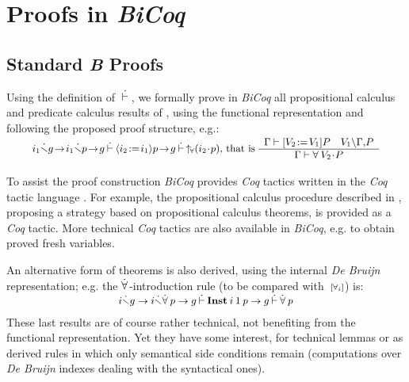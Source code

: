 \documentclass{llncs}
\begin{document}
\section{Proofs in \emph{BiCoq}}\label{sc_proofs}

\subsection{Standard \emph{B} Proofs}\label{ss_classic}

Using the definition of $\:\dot{\vdash}\:$, we formally prove in \emph{BiCoq} all propositional calculus 
and predicate calculus results of \cite{abr:1}, using the functional representation and 
following the proposed proof structure, e.g.:
\[
\small
\begin{array}{l}
\vspace{-16pt}\\
i_1\Bnotfree g\!\to\!i_1\Bnotfree p\!\to\!g\Binf\Baffec{i_2}{i_1}{p}\!\to\! 
 g\Binf\!\Bbdfor{i_2}{p}
\text{, that is }
\begin{array}{c}
 \Gamma\vdash[V_2\!:=\!V_1]P\quad V_1\backslash\Gamma,\!P\\\hline
 \Gamma\vdash\forall\:V_2\!\cdot\!P
\end{array}
\end{array}
\]

To assist the proof construction \emph{BiCoq} provides \emph{Coq} tactics written in the 
\emph{Coq} tactic language \cite{del:1}. For example, the propositional calculus procedure 
described in \cite{abr:1}, proposing a strategy based on propositional calculus theorems, is 
provided as a \emph{Coq} tactic. More technical \emph{Coq} tactics are also available in 
\emph{BiCoq}, e.g. to obtain proved fresh variables.

An alternative form of theorems is also derived, using the internal \emph{De Bruijn} 
representation; e.g. the $\dot{\forall}\:\!$-introduction rule (to be compared with 
$\:{\scriptstyle{[{\forall_i}]}}$) is:
\[
\small
\begin{array}{l}
\vspace{-16pt}\\
i\Bnotfree g\to i\Bnotfree\pfor p\to g\Binf\Bcmd{Inst}\:i\:\dbone\:p\to g\Binf\pfor p
\end{array}
\]
These last results are of course rather technical, not benefiting from the functional 
representation. Yet they have some interest, for technical lemmas or as derived rules in which 
only semantical side conditions remain (computations over \emph{De Bruijn} indexes dealing 
with the syntactical ones).
\end{document}
